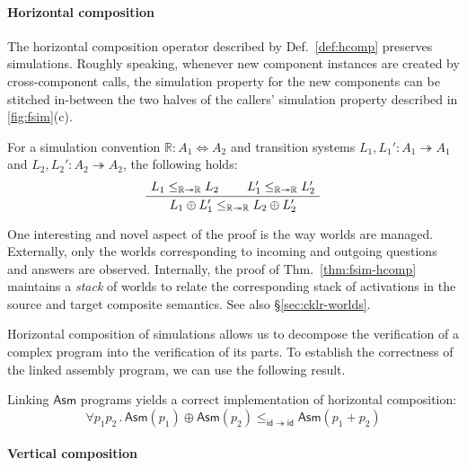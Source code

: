 \documentclass[sigplan,10pt,review]{acmart}
\newcommand{\kw}[1]{\ensuremath{ \mathsf{#1} }}
\begin{document}

\paragraph{Horizontal composition} %

The horizontal composition operator
described by Def.~\ref{def:hcomp}
preserves simulations.
Roughly speaking,
whenever new component instances are created
by cross-component calls,
the simulation property for the new components
can be stitched in-between
the two halves of the callers' simulation property
described in \autoref{fig:fsim}(c).

\begin{theorem} \label{thm:fsim-hcomp} %
For a simulation convention
$\mathbb{R} : A_1 \Leftrightarrow A_2$
and transition systems
$L_1, L_1' : A_1 \twoheadrightarrow A_1$ and
$L_2, L_2' : A_2 \twoheadrightarrow A_2$,
the following holds:
\[
    \AxiomC{$L_1 \le_{\mathbb{R} \twoheadrightarrow \mathbb{R}} L_2$}
    \AxiomC{$L_1' \le_{\mathbb{R} \twoheadrightarrow \mathbb{R}} L_2'$}
    \BinaryInfC{$L_1 \oplus L_1'
      \le_{\mathbb{R} \twoheadrightarrow \mathbb{R}}
      L_2 \oplus L_2'$}
    \DisplayProof
\]
\end{theorem}

One interesting and novel aspect of the proof
is the way worlds are managed.
Externally,
only the worlds corresponding to incoming and outgoing
questions and answers are observed.
Internally,
the proof of Thm.~\ref{thm:fsim-hcomp}
maintains a \emph{stack} of
worlds
to relate the corresponding stack of activations
in the source and target composite semantics.
See also \S\ref{sec:cklr-worlds}.

Horizontal composition of simulations
allows us to decompose the verification of a complex program
into the verification of its parts.
To establish the correctness of the linked assembly program,
we can use the following result.

\begin{theorem} \label{thm:asmlinking} %
Linking \kw{Asm} programs
yields a correct implementation of
horizontal composition:
\[
    \forall p_1 p_2 \,.\,
      \kw{Asm}(p_1) \oplus \kw{Asm}(p_2)
      \le_{\kw{id} \twoheadrightarrow \kw{id}}
      \kw{Asm}(p_1 + p_2)
\]
\end{theorem}


\paragraph{Vertical composition} %
\end{document}
